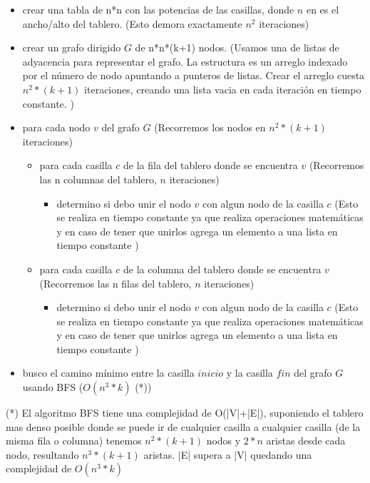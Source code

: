 \begin{itemize}
\item crear una tabla de n*n con las potencias de las casillas, donde $n$ en es el ancho/alto del tablero. (Esto demora exactamente $n^2$ iteraciones)
\item crear un grafo dirigido $G$ de n*n*(k+1) nodos. (Usamos una de listas de adyacencia para representar el grafo. La estructura es un arreglo indexado por el n\'umero de nodo apuntando a punteros de listas. Crear el arreglo cuesta $n^2*(k+1)$ iteraciones, creando una lista vacia en cada iteraci\'on en tiempo constante. \cite{complejidad_lista_construct})
\item para cada nodo $v$ del grafo $G$ (Recorremos los nodos en $n^2*(k+1)$ iteraciones)
	\begin{itemize}
	\item para cada casilla $c$ de la fila del tablero donde se encuentra $v$ (Recorremos las n columnas del tablero, $n$ iteraciones)
		\begin{itemize}
			\item determino si debo unir el nodo $v$ con algun nodo de la casilla $c$ (Esto se realiza en tiempo constante ya que realiza operaciones matem\'aticas y en caso de tener que unirlos agrega un elemento a una lista en tiempo constante \cite{complejidad_lista_push_back})
		\end{itemize}
	\end{itemize}
	\begin{itemize}
	\item para cada casilla $c$ de la columna del tablero donde se encuentra $v$ (Recorremos las n filas del tablero, $n$ iteraciones)
		\begin{itemize}
			\item determino si debo unir el nodo $v$ con algun nodo de la casilla $c$ (Esto se realiza en tiempo constante ya que realiza operaciones matem\'aticas y en caso de tener que unirlos agrega un elemento a una lista en tiempo constante \cite{complejidad_lista_push_back})
		\end{itemize}
	\end{itemize}
\item busco el camino m\'inimo entre la casilla $inicio$ y la casilla $fin$ del grafo $G$ usando BFS ($O(n^3*k)$ (*))
\end{itemize}

(*) El algoritmo BFS tiene una complejidad de O(|V|+|E|), suponiendo el tablero mas denso posible donde se puede ir de cualquier casilla a cualquier casilla (de la misma fila o columna) tenemos $n^2*(k+1)$ nodos y $2*n$ aristas desde cada nodo, resultando $n^3*(k+1)$ aristas. |E| supera a |V| quedando una complejidad de $O(n^3*k)$ \\

